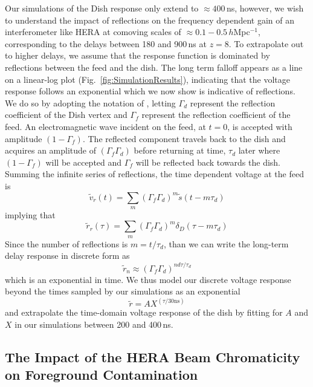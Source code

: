 \documentclass[twocolumn]{emulateapj}
\begin{document}
Our simulations of the Dish response only extend to $\approx 400$\,ns, however, we wish to understand the impact of reflections on the frequency dependent gain of an interferometer like HERA at comoving scales of $\approx 0.1-0.5$\,$h$Mpc$^{-1}$, corresponding to the delays between 180 and 900\,ns at $z=8$. To extrapolate out to higher delays, we assume that the response function is dominated by reflections between the feed and the dish. The long term falloff appears as a line on a linear-log plot (Fig.~\ref{fig:SimulationResults}), indicating that the voltage response follows an exponential which we now show is indicative of reflections. We do so by adopting the notation of \citet{Patra:2016}, letting $\Gamma_d$ represent the reflection coefficient of the Dish vertex and $\Gamma_f$ represent the reflection coefficient of the feed. An electromagnetic wave incident on the feed, at $t=0$, is accepted with amplitude $(1-\Gamma_f)$. The reflected component travels back to the dish and acquires an amplitude of $(\Gamma_f \Gamma_d)$ before returning at time, $\tau_d$ later where $(1-\Gamma_f)$ will be accepted and $\Gamma_f$ will be reflected back towards the dish. Summing the infinite series of reflections, the time dependent voltage at the feed is
\begin{equation}
\widetilde{v}_r(t) = \sum_m \left( \Gamma_f \Gamma_d \right)^m \widetilde{s}(t-m \tau_d)
\end{equation}
implying that
\begin{equation}
\widetilde{r}_r(\tau) = \sum_m \left( \Gamma_f \Gamma_d \right)^m \delta_D(\tau-m\tau_d)
\end{equation}
Since the number of reflections is $m=t/\tau_d$, than we can write the long-term delay response in discrete form as 
\begin{equation}
\widetilde{r}_n \approx (\Gamma_f \Gamma_d)^{n d\tau/\tau_d}
\end{equation}
which is an exponential in time. We thus model our discrete voltage response beyond the times sampled by our simulations as an exponential
\begin{equation}
\widetilde{r} = A X^{(\tau/30\text{ns})} 
\end{equation}
and extrapolate the time-domain voltage response of the dish by fitting for $A$ and $X$ in our simulations between 200 and 400\,ns.




\subsection{The Impact of the HERA Beam Chromaticity on Foreground Contamination}\label{ssec:Leakage}
\end{document}
